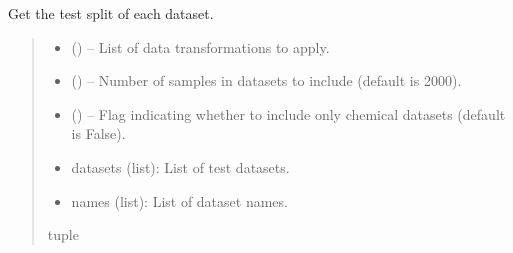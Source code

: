 \documentclass[letterpaper,10pt,english]{sphinxhowto}
\begin{document}

\begin{fulllineitems}
\label{\detokenize{datasets/loaders:datasets.loaders.get_test_datasets}}
\pysigstartsignatures
{}
\pysigstopsignatures
\sphinxAtStartPar
Get the test split of each dataset.
\begin{quote}\begin{description}
\begin{itemize}
\item {} 
\sphinxAtStartPar
{} () – List of data transformations to apply.

\item {} 
\sphinxAtStartPar
{} () – Number of samples in datasets to include (default is 2000).

\item {} 
\sphinxAtStartPar
{} () – Flag indicating whether to include only chemical datasets (default is False).

\end{itemize}

\sphinxAtStartPar
\begin{description}
\begin{itemize}
\item {} 
\sphinxAtStartPar
datasets (list): List of test datasets.

\item {} 
\sphinxAtStartPar
names (list): List of dataset names.

\end{itemize}

\end{description}


\sphinxAtStartPar
tuple

\end{description}\end{quote}

\end{fulllineitems}
\end{document}
